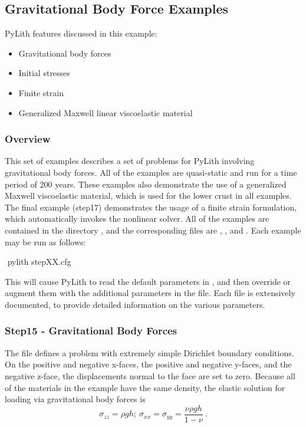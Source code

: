 \subsection{Gravitational Body Force Examples}
\label{sec:example:3dhex8:gravity}

PyLith features discussed in this example:
\begin{itemize}
\item Gravitational body forces
\item Initial stresses
\item Finite strain
\item Generalized Maxwell linear viscoelastic material
\end{itemize}

\subsubsection{Overview}

This set of examples describes a set of problems for PyLith involving
gravitational body forces. All of the examples are quasi-static and
run for a time period of 200 years. These examples also demonstrate
the use of a generalized Maxwell viscoelastic material, which is used
for the lower crust in all examples. The final example (step17)
demonstrates the usage of a finite strain formulation, which
automatically invokes the nonlinear solver. All of the examples are
contained in the directory , and the
corresponding  files are ,
, and .  Each example may be
run as follows:
\begin{shell}
$$ pylith stepXX.cfg
\end{shell}
This will cause PyLith to read the default parameters in
, and then override or augment them with the
additional parameters in the  file. Each
 file is extensively documented, to provide detailed
information on the various parameters.


\subsubsection{Step15 - Gravitational Body Forces}

The  file defines a problem with extremely simple
Dirichlet boundary conditions. On the positive and negative x-faces,
the positive and negative y-faces, and the negative z-face, the
displacements normal to the face are set to zero. Because all of the
materials in the example have the same density, the elastic solution
for loading via gravitational body forces is
\begin{equation}
\sigma_{zz}=\rho gh;\:\sigma_{xx}=\sigma_{yy}=\frac{\nu\rho gh}{1-\nu}\:.\label{eq:1-1}
\end{equation}


